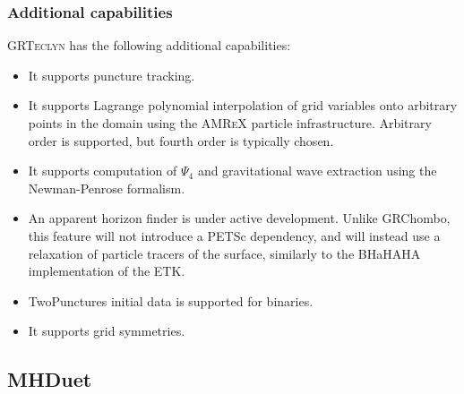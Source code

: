 \documentclass[12pt,a4paper]{article}
\numberwithin{figure}{subsection}
\newcommand{\grteclyn}{\textsc{GRTeclyn}\xspace}
\newcommand{\amrex}{\textsc{AMReX}\xspace}
\begin{document}
\subsubsection{Additional capabilities}
\grteclyn has the following additional capabilities:
\begin{itemize}
    \item It supports puncture tracking.
    \item It supports Lagrange polynomial interpolation of grid variables onto
    arbitrary points in the domain using the \amrex particle infrastructure.
    Arbitrary order is supported, but fourth order is typically chosen.
    \item It supports computation of $\Psi_4$ and gravitational wave extraction
    using the Newman-Penrose formalism\footnotemark.
    \item An apparent horizon finder is under active development. Unlike GRChombo, this feature will not 
    introduce a PETSc dependency, and will instead use a relaxation of particle tracers of the surface, 
    similarly to the BHaHAHA \cite{Etienne:2025auk} implementation of the ETK. 
    \item TwoPunctures initial data is supported for binaries.
    \item It supports grid symmetries.
\end{itemize}

\subsection{MHDuet}
\end{document}
